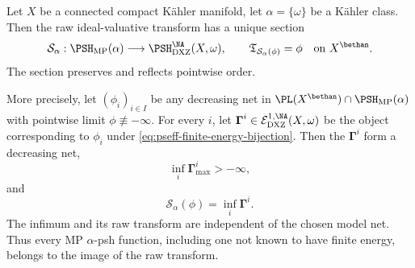 \begin{theorem}\label{thm:p143-mp-section}
Let \(X\) be a connected compact K\"ahler manifold, let
\(\alpha=\{\omega\}\) be a K\"ahler class.  Then the raw
ideal-valuative transform has a unique section
\[
 \mathcal S_\alpha:\PSH_{\mathrm{MP}}(\alpha)
        \longrightarrow\PSH^{\NA}_{\mathrm{DXZ}}(X,\omega),
 \qquad
 \mathfrak T_{\mathcal S_\alpha(\phi)}=\phi
 \quad\text{on }X^{\bethan}.
\]
The section preserves and reflects pointwise order.

More precisely, let \((\phi_i)_{i\in I}\) be any decreasing net in
\(\PL(X^{\bethan})\cap\PSH_{\mathrm{MP}}(\alpha)\) with pointwise limit
\(\phi\not\equiv-\infty\).  For every \(i\), let
\(\boldsymbol\Gamma^i\in
\mathcal E^{1,\NA}_{\mathrm{DXZ}}(X,\omega)\) be the object corresponding
to \(\phi_i\) under \eqref{eq:pseff-finite-energy-bijection}.  Then the
\(\boldsymbol\Gamma^i\) form a decreasing net,
\[
                 \inf_i\boldsymbol\Gamma^i_{\max}>-\infty,
\]
and
\[
                 \mathcal S_\alpha(\phi)
                 =\inf_i\boldsymbol\Gamma^i.
\]
The infimum and its raw transform are independent of the chosen model net.
Thus every MP \(\alpha\)-psh function, including one not known to have
finite energy, belongs to the image of the raw transform.
\end{theorem}

